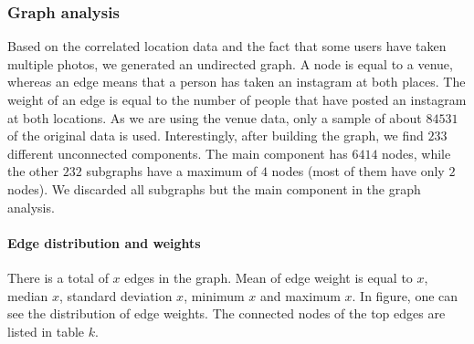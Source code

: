 \subsubsection{Graph analysis}

Based on the correlated location data and the fact that some users have taken multiple photos, we generated an undirected graph. A node is equal to a venue, whereas an edge means that a person has taken an instagram at both places. The weight of an edge is equal to the number of people that have posted an instagram at both locations. As we are using the venue data, only a sample of about $84531$ of the original data is used. Interestingly, after building the graph, we find $233$ different unconnected components. The main component has $6414$ nodes, while the other $232$ subgraphs have a maximum of $4$ nodes (most of them have only $2$ nodes). We discarded all subgraphs but the main component in the graph analysis.

\paragraph{Edge distribution and weights}
There is a total of $x$ edges in the graph. Mean of edge weight is equal to $x$, median $x$, standard deviation $x$, minimum $x$ and maximum $x$. In figure, one can see the distribution of edge weights. The connected nodes of the top edges are listed in table $k$. 

